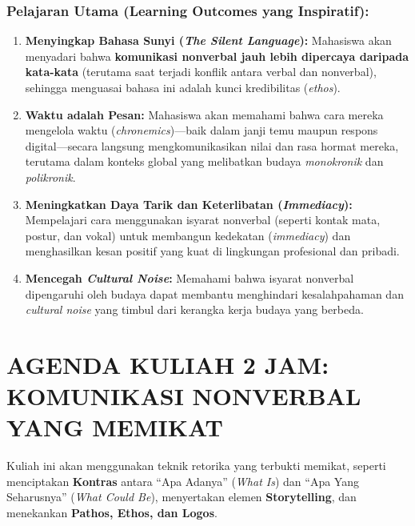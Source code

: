 \documentclass[
  letterpaper,
  DIV=11,
  numbers=noendperiod]{scrreprt}
\providecommand{\tightlist}{%
  \setlength{\itemsep}{0pt}\setlength{\parskip}{0pt}}
\begin{document}
\subsubsection{Pelajaran Utama (Learning Outcomes yang
Inspiratif):}\label{pelajaran-utama-learning-outcomes-yang-inspiratif}

\begin{enumerate}
\def\labelenumi{\arabic{enumi}.}
\tightlist
\item
  \textbf{Menyingkap Bahasa Sunyi (\emph{The Silent Language}):}
  Mahasiswa akan menyadari bahwa \textbf{komunikasi nonverbal jauh lebih
  dipercaya daripada kata-kata} (terutama saat terjadi konflik antara
  verbal dan nonverbal), sehingga menguasai bahasa ini adalah kunci
  kredibilitas (\emph{ethos}).
\item
  \textbf{Waktu adalah Pesan:} Mahasiswa akan memahami bahwa cara mereka
  mengelola waktu (\emph{chronemics})---baik dalam janji temu maupun
  respons digital---secara langsung mengkomunikasikan nilai dan rasa
  hormat mereka, terutama dalam konteks global yang melibatkan budaya
  \emph{monokronik} dan \emph{polikronik}.
\item
  \textbf{Meningkatkan Daya Tarik dan Keterlibatan (\emph{Immediacy}):}
  Mempelajari cara menggunakan isyarat nonverbal (seperti kontak mata,
  postur, dan vokal) untuk membangun kedekatan (\emph{immediacy}) dan
  menghasilkan kesan positif yang kuat di lingkungan profesional dan
  pribadi.
\item
  \textbf{Mencegah \emph{Cultural Noise}:} Memahami bahwa isyarat
  nonverbal dipengaruhi oleh budaya dapat membantu menghindari
  kesalahpahaman dan \emph{cultural noise} yang timbul dari kerangka
  kerja budaya yang berbeda.
\end{enumerate}

\section{AGENDA KULIAH 2 JAM: KOMUNIKASI NONVERBAL YANG
MEMIKAT}\label{agenda-kuliah-2-jam-komunikasi-nonverbal-yang-memikat}

Kuliah ini akan menggunakan teknik retorika yang terbukti memikat,
seperti menciptakan \textbf{Kontras} antara ``Apa Adanya'' (\emph{What
Is}) dan ``Apa Yang Seharusnya'' (\emph{What Could Be}), menyertakan
elemen \textbf{Storytelling}, dan menekankan \textbf{Pathos, Ethos, dan
Logos}.
\end{document}
